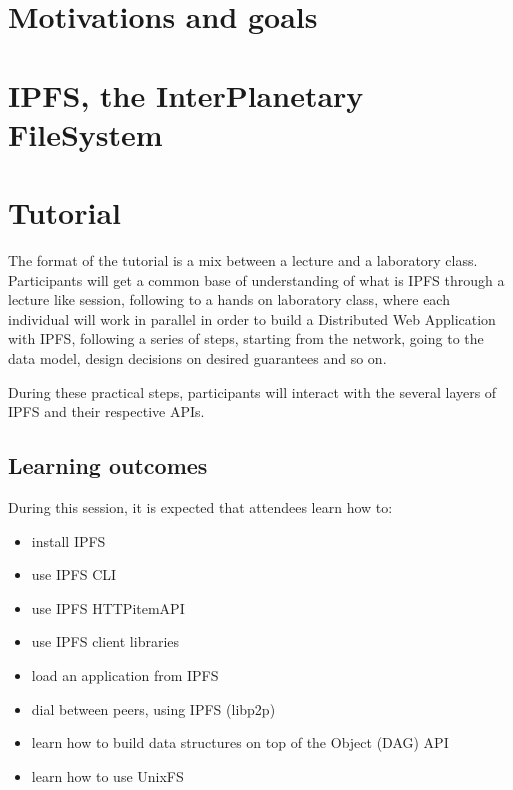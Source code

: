 \documentclass[runningheads,a4paper]{llncs}
\begin{document}

\section{Motivations and goals}\label{sec:motivation}



\section{IPFS, the InterPlanetary FileSystem}\label{sec:ipfs}



\section{Tutorial}\label{sec:tutorial}

The format of the tutorial is a mix between a lecture and a laboratory class. Participants will get a common base of understanding of what is IPFS through a lecture like session, following to a hands on laboratory class, where each individual will work in parallel in order to build a Distributed Web Application with IPFS, following a series of steps, starting from the network, going to the data model, design decisions on desired guarantees and so on.

During these practical steps, participants will interact with the several layers of IPFS and their respective APIs.

\subsection{Learning outcomes}

During this session, it is expected that attendees learn how to:

\begin{itemize}
  \item install IPFS
  \item use IPFS CLI
  \item use IPFS HTTPitemAPI
  \item use IPFS client libraries
  \item load an application from IPFS
  \item dial between peers, using IPFS (libp2p)
  \item learn how to build data structures on top of the Object (DAG) API
  \item learn how to use UnixFS
\end{itemize}
\end{document}
